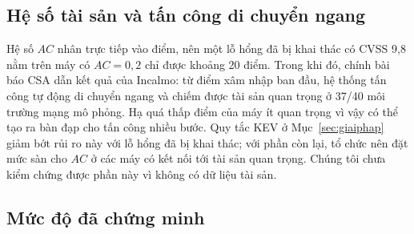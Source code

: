 \documentclass[runningheads]{llncs}
\begin{document}
\subsection{Hệ số tài sản và tấn công di chuyển ngang}

Hệ số $AC$ nhân trực tiếp vào điểm, nên một lỗ hổng đã bị khai thác có CVSS 9,8 nằm trên máy có
$AC = 0{,}2$ chỉ được khoảng 20 điểm. Trong khi đó, chính bài báo CSA dẫn kết quả của Incalmo:
từ điểm xâm nhập ban đầu, hệ thống tấn công tự động di chuyển ngang và chiếm được tài sản quan trọng ở
37/40 môi trường mạng mô phỏng. Hạ quá thấp
điểm của máy ít quan trọng vì vậy có thể tạo ra bàn đạp cho tấn công nhiều bước. Quy tắc KEV ở
Mục~\ref{sec:giaiphap} giảm bớt rủi ro này với lỗ hổng đã bị khai thác; với phần còn lại, tổ
chức nên đặt mức sàn cho $AC$ ở các máy có kết nối tới tài sản quan trọng. Chúng tôi chưa kiểm
chứng được phần này vì không có dữ liệu tài sản.

\subsection{Mức độ đã chứng minh}
\end{document}
